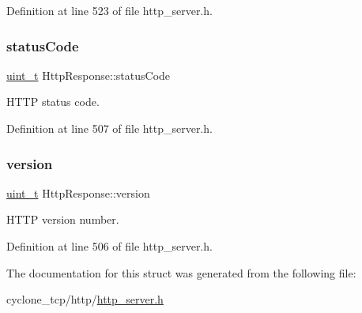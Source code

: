 Definition at line 523 of file http\+\_\+server.\+h.

\mbox{\label{structHttpResponse_a6ea57a72996cbdfffa977ea8cbc65a85}} 
\subsubsection{\texorpdfstring{status\+Code}{statusCode}}
{\footnotesize\ttfamily \hyperlink{compiler__port_8h_a12a1e9b3ce141648783a82445d02b58d}{uint\+\_\+t} Http\+Response\+::status\+Code}



H\+T\+TP status code. 



Definition at line 507 of file http\+\_\+server.\+h.

\mbox{\label{structHttpResponse_a5b464404cde85d38302f5a0bb52b07c2}} 
\subsubsection{\texorpdfstring{version}{version}}
{\footnotesize\ttfamily \hyperlink{compiler__port_8h_a12a1e9b3ce141648783a82445d02b58d}{uint\+\_\+t} Http\+Response\+::version}



H\+T\+TP version number. 



Definition at line 506 of file http\+\_\+server.\+h.



The documentation for this struct was generated from the following file\+:\begin{DoxyCompactItemize}
\item 
cyclone\+\_\+tcp/http/\hyperlink{http__server_8h}{http\+\_\+server.\+h}\end{DoxyCompactItemize}
